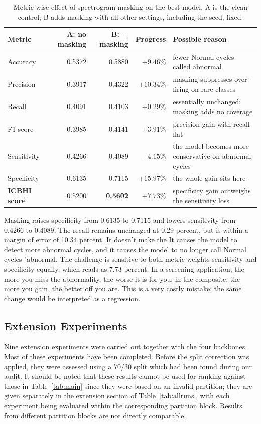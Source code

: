 \documentclass[journal,onecolumn]{IEEEtran}
\newcommand{\best}[1]{\textbf{#1}}
\begin{document}
\begin{table}[hbtp]
\centering
\caption{Metric-wise effect of spectrogram masking on the best model. A is the clean control; B adds masking with all other settings, including the seed, fixed.
}
\label{tab:ablationreason}
\footnotesize
\begin{tabular}{lrrrl}
\toprule
Metric & A: no masking & B: + masking & Progress & Possible reason \\
\midrule
Accuracy    & 0.5372 & 0.5880 & $+9.46\%$  & fewer Normal cycles called abnormal \\
Precision   & 0.3917 & 0.4322 & $+10.34\%$ & masking suppresses over-firing on rare classes \\
Recall      & 0.4091 & 0.4103 & $+0.29\%$  & essentially unchanged; masking adds no coverage \\
F1-score    & 0.3985 & 0.4141 & $+3.91\%$  & precision gain with recall flat \\
Sensitivity & 0.4266 & 0.4089 & $-4.15\%$  & the model becomes more conservative on abnormal cycles \\
Specificity & 0.6135 & 0.7115 & $+15.97\%$ & the whole gain sits here \\
\best{ICBHI score} & 0.5200 & \best{0.5602} & \best{$+7.73\%$} & specificity gain outweighs the sensitivity loss \\
\bottomrule
\end{tabular}
\end{table}

Masking raises specificity from 0.6135 to 0.7115 and lowers sensitivity from 0.4266 to 0.4089,
The recall remains unchanged at 0.29 percent, but is within a margin of error of 10.34 percent. It doesn't make the
It causes the model to detect more abnormal cycles, and it causes the model to no longer call Normal cycles "abnormal. The
challenge is sensitive to both metric weights sensitivity and specificity equally, which reads as 7.73 percent.
In a screening application, the more you miss the abnormality, the worse it is for you; in the composite, the more you gain, the better off you are.
This is a very costly mistake; the same change would be interpreted as a regression.

\subsection{Extension Experiments}

\label{subsec:extensions}

Nine extension experiments were carried out together with the four backbones. Most of these experiments have been completed. Before the split correction was applied, they were assessed using a 70/30 split which had been found during our audit. It should be noted that these results cannot be used for ranking against those in Table~\ref{tab:main} since they were based on an invalid partition; they are given separately in the extension section of Table~\ref{tab:allruns}, with each experiment being evaluated within the corresponding partition block. Results from different partition blocks are not directly comparable.
\end{document}
